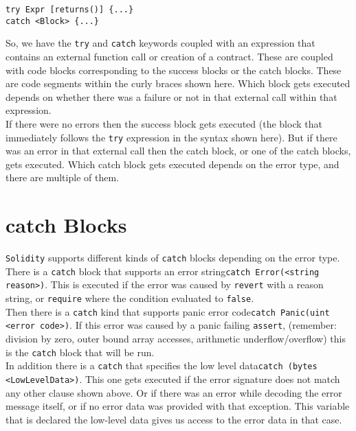 \begin{lstlisting}[language=Solidity, style=solStyle, caption={try/catch example}]
try Expr [returns()] {...}
catch <Block> {...}
\end{lstlisting}

So, we have the \texttt{try} and \texttt{catch} keywords coupled with an expression that contains an external function call or creation of a contract. These are coupled with code blocks corresponding to the success blocks or the catch blocks. These are code segments within the curly braces shown here. Which block gets executed depends on whether there was a failure or not in that external call within that expression.\\

If there were no errors then the success block gets executed (the block that immediately follows the \texttt{try} expression in the syntax shown here). But if there was an error in that external call then the catch block, or one of the catch blocks, gets executed. Which catch block gets executed depends on the error type, and there are multiple of them.

\section{catch Blocks}
\texttt{Solidity} supports different kinds of \texttt{catch} blocks depending on the error type. There is a \texttt{catch} block that supports an error string\linebreak\texttt{catch Error(<string reason>)}. This is executed if the error was caused by \texttt{revert} with a reason string, or \texttt{require} where the condition evaluated to \texttt{false}.\\

Then there is a \texttt{catch} kind that supports panic error code\linebreak\texttt{catch Panic(uint <error code>)}. If this error was caused by a panic failing \texttt{assert}, (remember: division by zero, outer bound array accesses, arithmetic underflow/overflow) this is the \texttt{catch} block that will be run.\\

In addition there is a \texttt{catch} that specifies the low level data\linebreak\texttt{catch (bytes <LowLevelData>)}. This one gets executed if the error signature does not match any other clause shown above. Or if there was an error while decoding the error message itself, or if no error data was provided with that exception. This variable that is declared the low-level data gives us access to the error data in that case.\\

